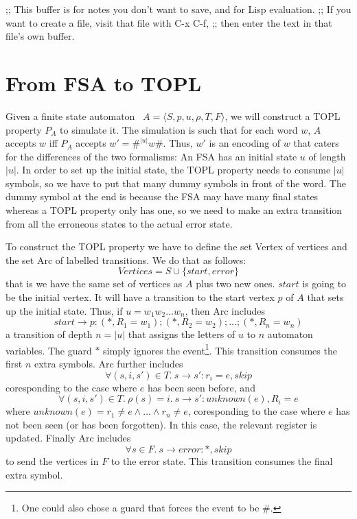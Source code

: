 ;; This buffer is for notes you don't want to save, and for Lisp evaluation.
;; If you want to create a file, visit that file with C-x C-f,
;; then enter the text in that file's own buffer.

\section{From FSA to TOPL}
 
Given a finite state automaton~\cite{dblp:journals/tcs/kaminskif94} $A=\langle S, p, u, \rho, T,
F\rangle$, we will construct a TOPL property $P_A$ to simulate it. The
simulation is such that for each word $w$, $A$ accepts $w$ iff $P_A$
accepts $w' = \#^{|u|}w\#$. Thus, $w'$ is an encoding of $w$ that
caters for the differences of the two formalisms: An FSA has an
initial state $u$ of length $|u|$. In order to set up the initial
state, the TOPL property needs to consume $|u|$ symbols, so we have to
put that many dummy symbols in front of the word. The dummy symbol at
the end is because the FSA may have many final states whereas a TOPL
property only has one, so we need to make an extra transition from all
the erroneous states to the actual error state.


To construct the TOPL property we have to define the set Vertex
of vertices and the set Arc of labelled transitions. We do that as follows:
\[
Vertices = S \cup \{start, error\}
\]
that is we have the same set of vertices as $A$ plus two new
ones. $start$ is going to be the initial vertex. It will have a
transition to the start vertex $p$ of $A$ that sets up the
initial state. Thus, if $u = w_1w_2\ldots w_n$, then Arc includes
\[
start \to p: (*,R_1=w_1);(*,R_2=w_2);\ldots;(*,R_n=w_n)
\]
a transition of depth $n = |u|$ that assigns the letters of $u$
to $n$ automaton variables. The guard $*$ simply ignores the
event\footnote{One could also chose a guard that forces the event
to be \#.}. This transition consumes the first $n$ extra
symbols. Arc further includes
\[
\forall (s, i, s') \in T.\ s\to s': r_i=e, skip
\]
coresponding to the case where $e$ has been seen before, and
\[
\forall (s, i, s') \in T.\ \rho(s)=i.\ s\to s': unknown(e), R_i=e
\]
where $unknown(e) = r_1 \neq e \land \ldots \land r_n \neq e$,
coresponding to the case where $e$ has not been seen (or has been
forgotten). In this case, the relevant register is
updated. Finally Arc includes
\[
\forall s\in F.\ s\to error: *, skip
\]
to send the vertices in $F$ to the error state. This transition
consumes the final extra symbol.
